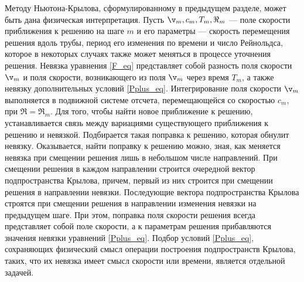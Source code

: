 


Методу Ньютона-Крылова, сформулированному в предыдущем разделе, может быть дана физическая интерпретация. Пусть $\v_m, c_m, T_m, \Re_m$ --- поле скорости приближения к решению на шаге $m$ и его параметры --- скорость перемещения решения вдоль трубы, период его изменения по времени и число Рейнольдса, которое в некоторых случаях также может меняться в процессе уточнения решения. Невязка уравнения \eqref{F_eq} представляет собой разность поля скорости $\v_m$ и поля скорости, возникающего из поля $\v_m$ через время $T_m$, а также невязку дополнительных условий \eqref{Pplus_eq}. Интегрирование поля скорости $\v_m$ выполняется в подвижной системе отсчета, перемещающейся со скоростью $c_m$, при $\Re = \Re_m$. Для того, чтобы найти новое приближение к решению, устанавливается связь между вариациями существующего приближения к решению и невязкой. Подбирается такая поправка к решению, которая обнулит невязку. Оказывается, найти поправку к решению можно, зная, как меняется невязка при смещении решения лишь в небольшом числе направлений. При смещении решения в каждом направлении строится очередной вектор подпространства Крылова, причем, первый из них строится при смещении решения в направлении невязки. Последующие вектора подпространства Крылова строятся при смещении решения в направлении изменения невязки на предыдущем шаге. При этом, поправка поля скорости решения всегда представляет собой поле скорости, а к параметрам решения прибавляются значения невязки уравнений \eqref{Pplus_eq}. Подбор условий \eqref{Pplus_eq}, сохраняющих физический смысл операции построения подпространств Крылова, таких, что их невязка имеет смысл скорости или времени, является отдельной задачей. 

